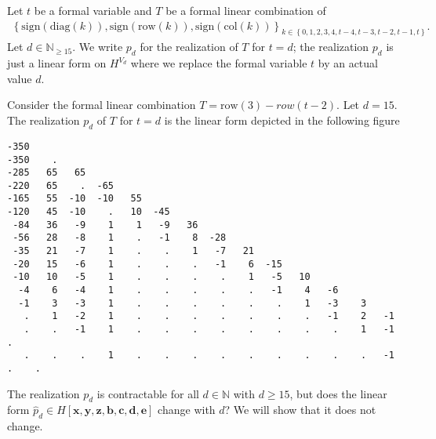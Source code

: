 \begin{definition}
    Let \( t \) be a formal variable and \( T \) be a formal linear combination of
    \begin{align*}
        \left\{ \mathrm{sign}(\mathrm{diag}(k)), \mathrm{sign}(\mathrm{row}(k)), \mathrm{sign}(\mathrm{col}(k)) \right\}_{k \in \left\{ 0,1,2,3,4,t-4,t-3,t-2,t-1,t \right\}}.
    \end{align*}
    Let \( d \in \mathbb{N}_{\geq 15}\). We write \( p_d \) for the realization of \( T \) for \( t = d \); the realization \( p_d \) is just a linear form on \( H^{V_d} \) where we replace the formal variable \( t \) by an actual value \( d \).
\end{definition}


\pagebreak

\begin{example}
    Consider the formal linear combination \( T = \mathrm{row}(3) - row(t - 2) \). Let \( d = 15 \). The realization \( p_d \) of \( T \) for \( t = d \) is the linear form depicted in the following figure
    \begin{verbatim}
-350 
-350    . 
-285   65   65 
-220   65    .  -65 
-165   55  -10  -10   55 
-120   45  -10    .   10  -45 
 -84   36   -9    1    1   -9   36 
 -56   28   -8    1    .   -1    8  -28 
 -35   21   -7    1    .    .    1   -7   21 
 -20   15   -6    1    .    .    .   -1    6  -15 
 -10   10   -5    1    .    .    .    .    1   -5   10 
  -4    6   -4    1    .    .    .    .    .   -1    4   -6 
  -1    3   -3    1    .    .    .    .    .    .    1   -3    3 
   .    1   -2    1    .    .    .    .    .    .    .   -1    2   -1 
   .    .   -1    1    .    .    .    .    .    .    .    .    1   -1    . 
   .    .    .    1    .    .    .    .    .    .    .    .    .   -1    .    .         
    \end{verbatim}
    The realization \( p_d \) is contractable for all \( d \in \mathbb{N} \) with \( d \geq 15 \), but does the linear form \( \hat p_d \in H[\mathbf{x}, \mathbf{y}, \mathbf{z}, \mathbf{b}, \mathbf{c}, \mathbf{d}, \mathbf{e}]\) change with \( d \)? We will show that it does not change.
\end{example}

